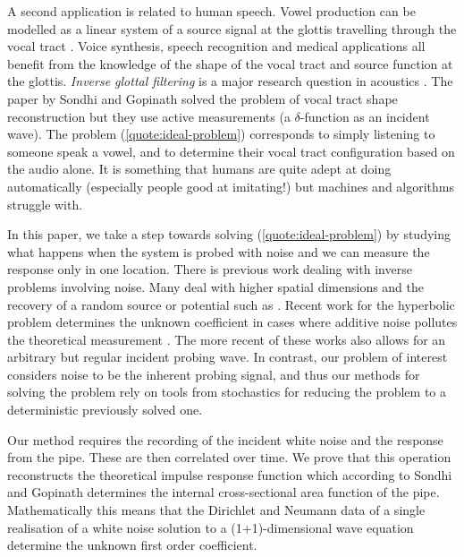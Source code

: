 \documentclass[10pt,a4paper]{article}
\theoremstyle{plain}
\theoremstyle{definition}
\theoremstyle{remark}
\numberwithin{equation}{section}
\begin{document}
A second application is related to human speech. Vowel production can be modelled as a linear system of a source signal at the glottis travelling through the vocal tract \cite[Chapter 6]{titze00_princ_voice_produc}. Voice synthesis, speech recognition and medical applications all benefit from the knowledge of the shape of the vocal tract and source function at the glottis. \emph{Inverse glottal filtering} is a major research question in acoustics \cite{alku11_glott_inver_filter_analy_human}. The paper by Sondhi and Gopinath \cite{sondhi_gopinath} solved the problem of vocal tract shape reconstruction but they use active measurements (a $\delta$-function as an incident wave). The problem (\ref{quote:ideal-problem}) corresponds to simply listening to someone speak a vowel, and to determine their vocal tract configuration based on the audio alone. It is something that humans are quite adept at doing automatically (especially people good at imitating!) but machines and algorithms struggle with.

\smallskip In this paper, we take a step towards solving (\ref{quote:ideal-problem}) by studying what happens when the system is probed with noise and we can measure the response only in one location. { There is previous work dealing with inverse problems involving noise. Many deal with higher {spatial} dimensions and the recovery of a random source or potential such as \cite{bao16_inver_random_sourc_scatt_probl_sever_dimen,liu23_inver_probl_random_schro_equat}. Recent work for the hyperbolic problem determines the unknown coefficient in cases where additive noise pollutes the theoretical measurement \cite{korpela16_regul_strat_inver_probl_1,romanov20_recon_princ_coeff_damped_wave}. The more recent of these works also allows for an arbitrary but regular incident probing wave. In contrast, our problem of interest considers noise to be the inherent probing signal, and thus our methods for solving the problem rely on tools from stochastics for reducing the problem to a deterministic previously solved one.}

Our method requires the recording of the incident white noise and the response from the pipe. These are then correlated over time. We prove that this operation reconstructs the theoretical impulse response function which according to Sondhi and Gopinath \cite{sondhi_gopinath} determines the internal cross-sectional area function of the pipe. Mathematically this means that the {Dirichlet} and Neumann data of a single realisation of a white noise solution to a (1+1)-dimensional wave equation {determine} the unknown first order coefficient.
\end{document}
